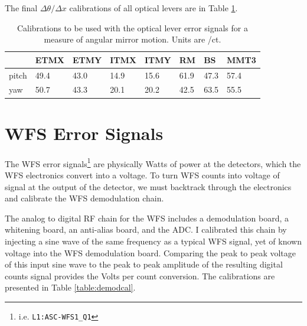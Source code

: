 The final $\Delta\theta / \Delta x$ calibrations of all optical levers
are in Table \ref{table:oplevcal}. 

\begin{table}
\centering
\caption[Optical lever calibrations]{Calibrations to be used
  with the optical lever error signals 
  for a measure of angular mirror motion. Units are \microrad/ct.}
\begin{tabular}{l l l l l l l l}
\hline
        & ETMX & ETMY & ITMX & ITMY & RM & BS & MMT3 \\
\hline
pitch & 49.4 & 43.0 & 14.9 & 15.6 & 61.9 & 47.3 & 57.4 \\
yaw & 50.7 & 43.3 & 20.1 & 20.2 & 42.5 & 63.5 & 55.5 \\
\hline
\end{tabular}
\label{table:oplevcal}
\end{table}





\section{WFS Error Signals}
The WFS error signals\footnote{i.e. \texttt{L1:ASC-WFS1\_Q1}} are physically
Watts of power at the detectors, which the WFS electronics convert
into a voltage. To turn WFS counts into voltage of signal at the
output of the detector, we must backtrack through the electronics and
calibrate the WFS demodulation chain.


The analog to digital RF chain for the WFS includes a demodulation
board, a whitening board, an anti-alias board, and the ADC. I
calibrated this chain by injecting a sine wave of the same frequency
as a typical WFS signal, yet of known voltage into the WFS
demodulation board. Comparing the peak to peak voltage of this input
sine wave to the peak to peak amplitude of the resulting digital
counts signal provides the Volts per count conversion. The
calibrations are presented in Table \ref{table:demodcal}.

